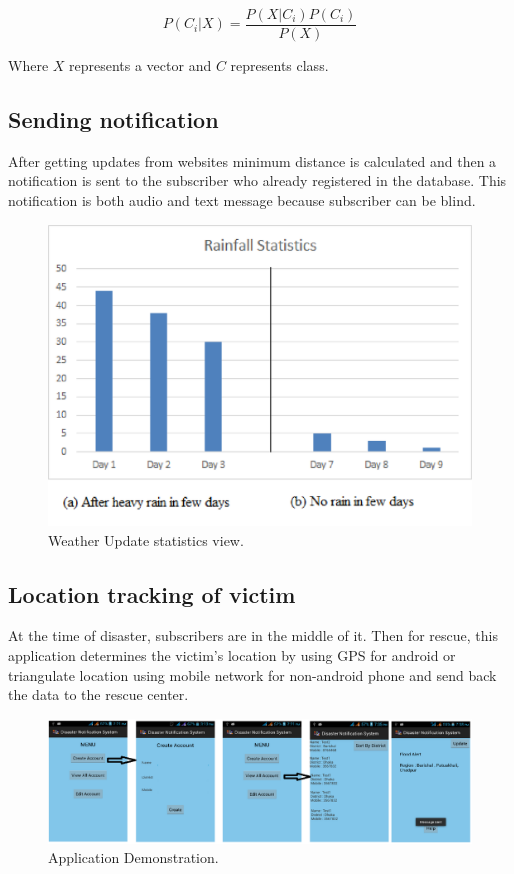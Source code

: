 \documentclass[conference]{IEEEtran}
\begin{document}
\begin{equation}
P(C_i|X) = \frac{P(X|C_i)P(C_i)}{P(X)}
\label{eq:naive}
\end{equation}

Where $X$ represents a vector and $C$ represents class.

\subsection{Sending notification}
After getting updates from websites minimum distance is calculated and then a notification is sent to the subscriber who already registered in the database. This notification is both audio and text message because subscriber can be blind.


\begin{figure}[htp]
	\centering
		\includegraphics[width=.49\textwidth]{fig/floodjs.eps}
	\caption{ Weather Update statistics view.  }
	\label{Figure:rainfall}
\end{figure}



\subsection{Location tracking of victim}
At the time of disaster, subscribers are in the middle of it. Then for rescue, this application determines the victim’s location by using GPS for android or triangulate location using mobile network for non-android phone and send back the data to the rescue center.




\begin{figure}[htp]
	\centering
		\includegraphics[width=.95\textwidth]{fig/scrnn.eps}
	\caption{ Application Demonstration. }
	\label{Figure:application}
\end{figure}
\end{document}
